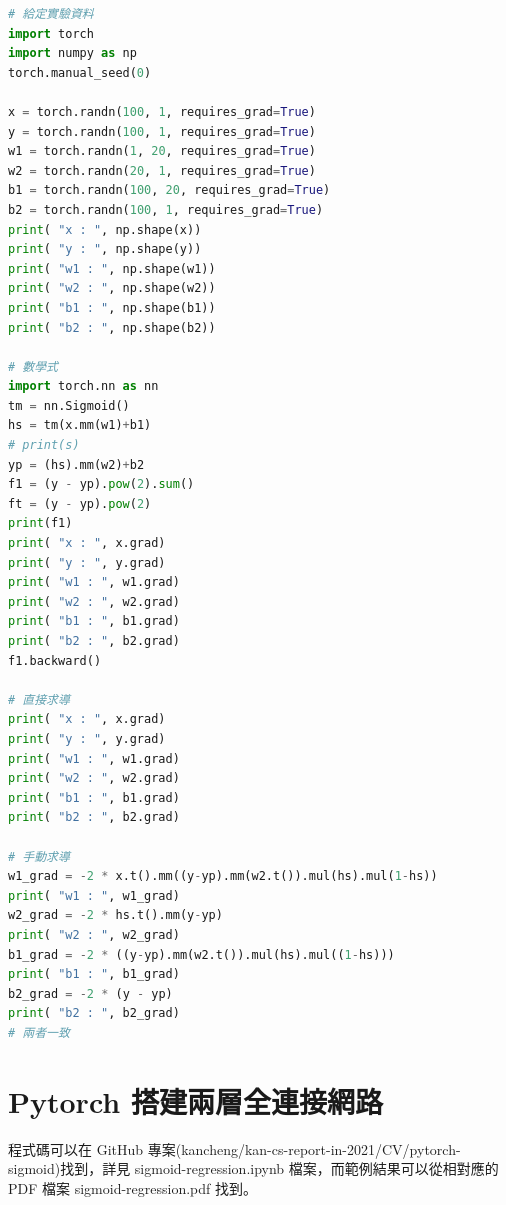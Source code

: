 \documentclass[11pt,UTF8]{ctexart}
\begin{document}
	\begin{lstlisting}[language={python}]
# 給定實驗資料
import torch
import numpy as np
torch.manual_seed(0)

x = torch.randn(100, 1, requires_grad=True)
y = torch.randn(100, 1, requires_grad=True)
w1 = torch.randn(1, 20, requires_grad=True)
w2 = torch.randn(20, 1, requires_grad=True)
b1 = torch.randn(100, 20, requires_grad=True)
b2 = torch.randn(100, 1, requires_grad=True)
print( "x : ", np.shape(x))
print( "y : ", np.shape(y))
print( "w1 : ", np.shape(w1))
print( "w2 : ", np.shape(w2))
print( "b1 : ", np.shape(b1))
print( "b2 : ", np.shape(b2))

# 數學式
import torch.nn as nn
tm = nn.Sigmoid()
hs = tm(x.mm(w1)+b1)
# print(s)
yp = (hs).mm(w2)+b2
f1 = (y - yp).pow(2).sum()
ft = (y - yp).pow(2)
print(f1)
print( "x : ", x.grad)
print( "y : ", y.grad)
print( "w1 : ", w1.grad)
print( "w2 : ", w2.grad)
print( "b1 : ", b1.grad)
print( "b2 : ", b2.grad)
f1.backward()

# 直接求導
print( "x : ", x.grad)
print( "y : ", y.grad)
print( "w1 : ", w1.grad)
print( "w2 : ", w2.grad)
print( "b1 : ", b1.grad)
print( "b2 : ", b2.grad)

# 手動求導
w1_grad = -2 * x.t().mm((y-yp).mm(w2.t()).mul(hs).mul(1-hs))
print( "w1 : ", w1_grad)
w2_grad = -2 * hs.t().mm(y-yp)
print( "w2 : ", w2_grad)
b1_grad = -2 * ((y-yp).mm(w2.t()).mul(hs).mul((1-hs)))
print( "b1 : ", b1_grad)
b2_grad = -2 * (y - yp)
print( "b2 : ", b2_grad)
# 兩者一致
	\end{lstlisting}

\newpage

\section{Pytorch 搭建兩層全連接網路}

程式碼可以在 GitHub 專案(kancheng/kan-cs-report-in-2021/CV/pytorch-sigmoid)找到，詳見 sigmoid-regression.ipynb 檔案，而範例結果可以從相對應的 PDF 檔案 sigmoid-regression.pdf 找到。
\end{document}
